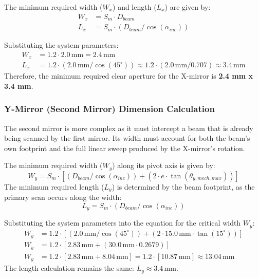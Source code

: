 \documentclass[12pt]{article}
\begin{document}
The minimum required width (\(W_x\)) and length (\(L_x\)) are given by:
\begin{align}
W_x &= S_m \cdot D_{beam} \\
L_x &= S_m \cdot (D_{beam} / \cos(\alpha_{inc}))
\end{align}

Substituting the system parameters:
\begin{align}
W_x &= 1.2 \cdot 2.0\,\text{mm} = 2.4\,\text{mm} \\
L_x &= 1.2 \cdot (2.0\,\text{mm} / \cos(45^\circ)) \approx 1.2 \cdot (2.0\,\text{mm} / 0.707) \approx 3.4\,\text{mm}
\end{align}
Therefore, the minimum required clear aperture for the X-mirror is \textbf{2.4 mm x 3.4 mm}.

\subsubsection{Y-Mirror (Second Mirror) Dimension Calculation}
The second mirror is more complex as it must intercept a beam that is already being scanned by the first mirror. Its width must account for both the beam's own footprint and the full linear sweep produced by the X-mirror's rotation.

The minimum required width (\(W_y\)) along its pivot axis is given by:
\begin{equation}
W_y = S_m \cdot \left[ (D_{beam} / \cos(\alpha_{inc})) + (2 \cdot e \cdot \tan(\theta_{y,mech,max})) \right]
\end{equation}
The minimum required length (\(L_y\)) is determined by the beam footprint, as the primary scan occurs along the width:
\begin{equation}
L_y = S_m \cdot (D_{beam} / \cos(\alpha_{inc}))
\end{equation}

Substituting the system parameters into the equation for the critical width \(W_y\):
\begin{align}
W_y &= 1.2 \cdot \left[ (2.0\,\text{mm} / \cos(45^\circ)) + (2 \cdot 15.0\,\text{mm} \cdot \tan(15^\circ)) \right] \\
W_y &= 1.2 \cdot [ 2.83\,\text{mm} + (30.0\,\text{mm} \cdot 0.2679) ] \\
W_y &= 1.2 \cdot [ 2.83\,\text{mm} + 8.04\,\text{mm} ] = 1.2 \cdot [10.87\,\text{mm}] \approx 13.04\,\text{mm}
\end{align}
The length calculation remains the same: \(L_y \approx 3.4\,\text{mm}\).
\end{document}
